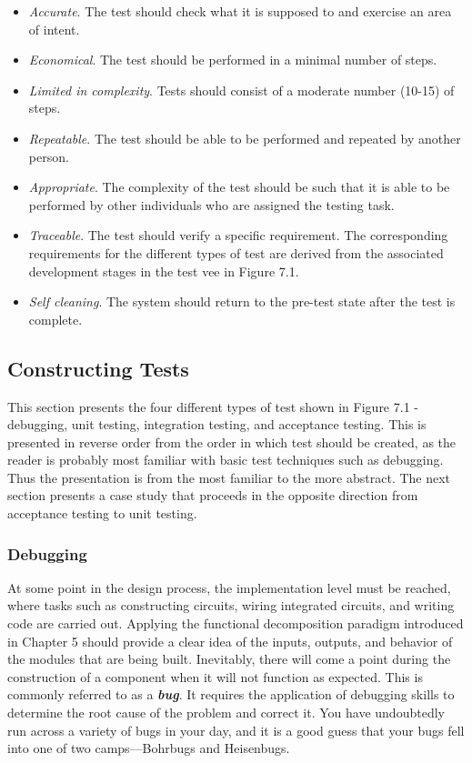 \begin{itemize}
\item
  \emph{Accurate}. The test should check what it is supposed to and
  exercise an area of intent.
\item
  \emph{Economical}. The test should be performed in a minimal number of
  steps.
\item
  \emph{Limited in complexity}. Tests should consist of a moderate
  number (10-15) of steps.
\item
  \emph{Repeatable}. The test should be able to be performed and
  repeated by another person.
\item
  \emph{Appropriate}. The complexity of the test should be such that it
  is able to be performed by other individuals who are assigned the
  testing task.
\item
  \emph{Traceable}. The test should verify a specific requirement. The
  corresponding requirements for the different types of test are derived
  from the associated development stages in the test vee in Figure 7.1.
\item
  \emph{Self cleaning}. The system should return to the pre-test state
  after the test is complete.
\end{itemize}

\subsection{Constructing Tests}\label{constructing-tests}

This section presents the four different types of test shown in Figure
7.1 - debugging, unit testing, integration testing, and acceptance
testing. This is presented in reverse order from the order in which test
should be created, as the reader is probably most familiar with basic
test techniques such as debugging. Thus the presentation is from the
most familiar to the more abstract. The next section presents a case
study that proceeds in the opposite direction from acceptance testing to
unit testing.

\subsubsection{Debugging}\label{debugging}

At some point in the design process, the implementation level must be
reached, where tasks such as constructing circuits, wiring integrated
circuits, and writing code are carried out. Applying the functional
decomposition paradigm introduced in Chapter 5 should provide a clear
idea of the inputs, outputs, and behavior of the modules that are being
built. Inevitably, there will come a point during the construction of a
component when it will not function as expected. This is commonly
referred to as a \emph{\textbf{bug}}. It requires the application of
debugging skills to determine the root cause of the problem and correct
it. You have undoubtedly run across a variety of bugs in your day, and
it is a good guess that your bugs fell into one of two camps---Bohrbugs
and Heisenbugs.

